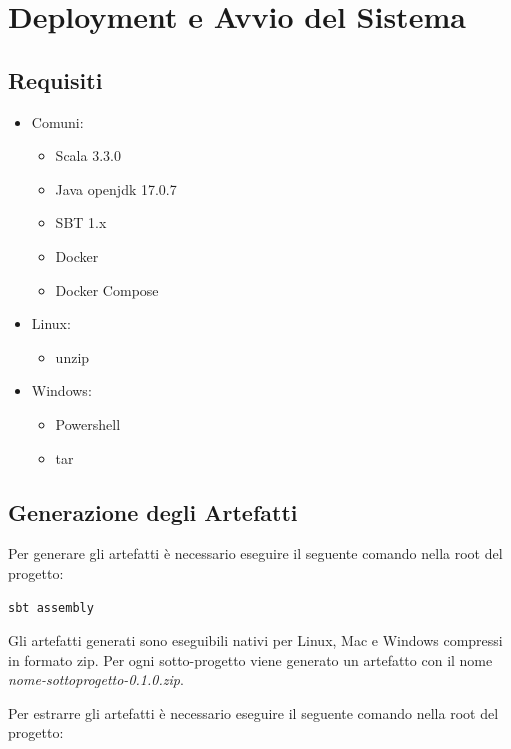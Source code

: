 \documentclass{scrartcl}
\begin{document}
\section{Deployment e Avvio del Sistema}

\subsection{Requisiti}
\begin{itemize}
    \item Comuni:
          \begin{itemize}
              \item Scala 3.3.0
              \item Java openjdk 17.0.7
              \item SBT 1.x
              \item Docker
              \item Docker Compose
          \end{itemize}
    \item Linux:
          \begin{itemize}
              \item unzip
          \end{itemize}
    \item Windows:
          \begin{itemize}
              \item Powershell
              \item tar
          \end{itemize}
\end{itemize}

\subsection{Generazione degli Artefatti}

Per generare gli artefatti è necessario eseguire il seguente comando nella root del progetto:

\begin{lstlisting}
sbt assembly
\end{lstlisting}

Gli artefatti generati sono eseguibili nativi per Linux, Mac e Windows compressi in formato zip. Per ogni sotto-progetto viene generato un artefatto con il nome \textit{nome-sottoprogetto-0.1.0.zip}.

Per estrarre gli artefatti è necessario eseguire il seguente comando nella root del progetto:
\end{document}
